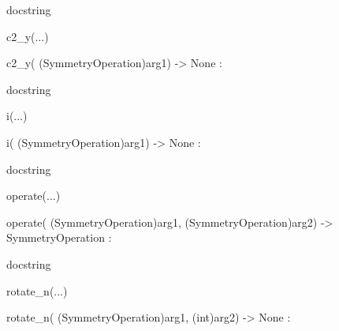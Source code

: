 \documentclass[letterpaper,10pt,english]{sphinxmanual}
\begin{document}
\begin{description}
\begin{description}
\begin{DUlineblock}{0em}
\begin{DUlineblock}{\DUlineblockindent}
\begin{DUlineblock}{\DUlineblockindent}
\item[] docstring
\item[] 
\end{DUlineblock}
\end{DUlineblock}
\item[] c2\_y(...)
\item[]
\begin{DUlineblock}{\DUlineblockindent}
\item[] c2\_y( (SymmetryOperation)arg1) -\textgreater{} None :
\item[]
\begin{DUlineblock}{\DUlineblockindent}
\item[] docstring
\item[] 
\end{DUlineblock}
\end{DUlineblock}
\item[] i(...)
\item[]
\begin{DUlineblock}{\DUlineblockindent}
\item[] i( (SymmetryOperation)arg1) -\textgreater{} None :
\item[]
\begin{DUlineblock}{\DUlineblockindent}
\item[] docstring
\item[] 
\end{DUlineblock}
\end{DUlineblock}
\item[] operate(...)
\item[]
\begin{DUlineblock}{\DUlineblockindent}
\item[] operate( (SymmetryOperation)arg1, (SymmetryOperation)arg2) -\textgreater{} SymmetryOperation :
\item[]
\begin{DUlineblock}{\DUlineblockindent}
\item[] docstring
\item[] 
\end{DUlineblock}
\end{DUlineblock}
\item[] rotate\_n(...)
\item[]
\begin{DUlineblock}{\DUlineblockindent}
\item[] rotate\_n( (SymmetryOperation)arg1, (int)arg2) -\textgreater{} None :
\item[]

\end{DUlineblock}
\end{DUlineblock}
\end{description}
\end{description}
\end{document}
